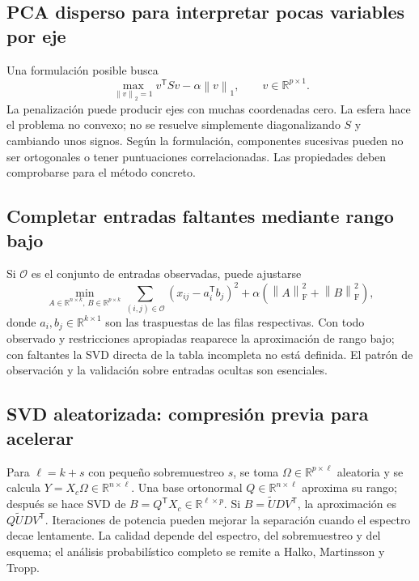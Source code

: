 \documentclass[11pt,a4paper]{article}
\newcommand{\R}{\mathbb R}
\newcommand{\T}{^{\mathsf T}}
\newcommand{\norm}[1]{\left\lVert #1\right\rVert}
\newcommand{\F}{_{\mathrm F}}
\theoremstyle{definition}
\begin{document}
\subsection{PCA disperso para interpretar pocas variables por eje}
Una formulación posible busca
\[
\max_{\norm v_2=1}v\T Sv-\alpha\norm v_1,\qquad v\in\R^{p\times1}.
\]
La penalización puede producir ejes con muchas coordenadas cero. La esfera hace el problema no convexo; no se resuelve simplemente diagonalizando $S$ y cambiando unos signos. Según la formulación, componentes sucesivas pueden no ser ortogonales o tener puntuaciones correlacionadas. Las propiedades deben comprobarse para el método concreto.
\subsection{Completar entradas faltantes mediante rango bajo}
Si $\mathcal O$ es el conjunto de entradas observadas, puede ajustarse
\[
\min_{A\in\R^{n\times k},\,B\in\R^{p\times k}}
\sum_{(i,j)\in\mathcal O}\left(x_{ij}-a_i\T b_j\right)^2
+\alpha(\norm A\F^2+\norm B\F^2),
\]
donde $a_i,b_j\in\R^{k\times1}$ son las traspuestas de las filas respectivas. Con todo observado y restricciones apropiadas reaparece la aproximación de rango bajo; con faltantes la SVD directa de la tabla incompleta no está definida. El patrón de observación y la validación sobre entradas ocultas son esenciales.
\subsection{SVD aleatorizada: compresión previa para acelerar}
Para $\ell=k+s$ con pequeño sobremuestreo $s$, se toma $\Omega\in\R^{p\times\ell}$ aleatoria y se calcula $Y=X_c\Omega\in\R^{n\times\ell}$. Una base ortonormal $Q\in\R^{n\times\ell}$ aproxima su rango; después se hace SVD de $B=Q\T X_c\in\R^{\ell\times p}$. Si $B=\widetilde UDV\T$, la aproximación es $Q\widetilde UDV\T$. Iteraciones de potencia pueden mejorar la separación cuando el espectro decae lentamente. La calidad depende del espectro, del sobremuestreo y del esquema; el análisis probabilístico completo se remite a Halko, Martinsson y Tropp.
\end{document}
